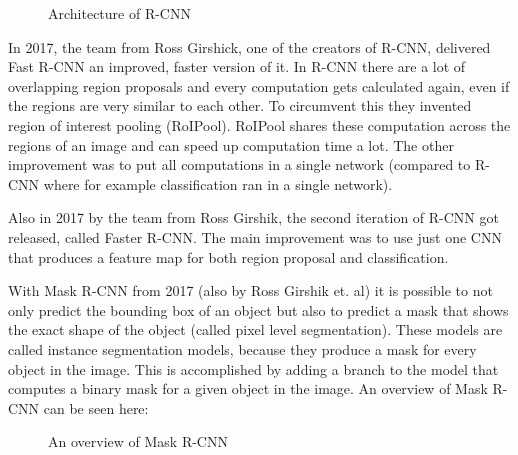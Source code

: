 \begin{figure}[!h]
	\caption{\label{fig:r-cnn} Architecture of R-CNN}
\end{figure}

In 2017, the team from Ross Girshick, one of the creators of R-CNN, delivered Fast R-CNN an improved, faster version of it. In R-CNN there are a lot of overlapping region proposals and every computation gets calculated again, even if the regions are very similar to each other. To circumvent this they invented region of interest pooling (RoIPool). RoIPool shares these computation across the regions of an image and can speed up computation time a lot. The other improvement was to put all computations in a single network (compared to R-CNN where for example classification ran in a single network).

Also in 2017 by the team from Ross Girshik, the second iteration of R-CNN got released, called Faster R-CNN. The main improvement was to use just one CNN that produces a feature map for both region proposal and classification.

With Mask R-CNN from 2017 (also by Ross Girshik et. al) it is possible to not only predict the bounding box of an object but also to predict a mask that shows the exact shape of the object (called pixel level segmentation). These models are called instance segmentation models, because they produce a mask for every object in the image. This is accomplished by adding a branch to the model that computes a binary mask for a given object in the image. An overview of Mask R-CNN can be seen here:

\begin{figure}[!h]
	\caption{\label{fig:maskrcnn2} An overview of Mask R-CNN}
\end{figure}

